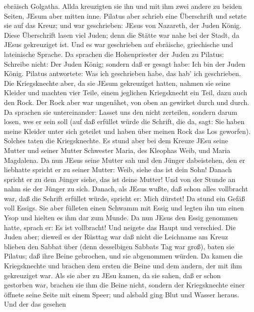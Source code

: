 ebräisch Golgatha.  Allda kreuzigten sie ihn und mit ihm
zwei andere zu beiden Seiten, JEsum aber mitten inne. 
Pilatus aber schrieb eine Überschrift und setzte sie auf das Kreuz; und
war geschrieben: JEsus von Nazareth, der Juden König. 
Diese Überschrift lasen viel Juden; denn die Stätte war nahe bei der
Stadt, da JEsus gekreuziget ist. Und es war geschrieben auf ebräische,
griechische und lateinische Sprache.  Da sprachen die
Hohenpriester der Juden zu Pilatus: Schreibe nicht: Der Juden König;
sondern daß er gesagt habe: Ich bin der Juden König. 
Pilatus antwortete: Was ich geschrieben habe, das hab' ich geschrieben.
 Die Kriegsknechte aber, da sie JEsum gekreuziget hatten,
nahmen sie seine Kleider und machten vier Teile, einem jeglichen
Kriegsknecht ein Teil, dazu auch den Rock. Der Rock aber war ungenähet,
von oben an gewirket durch und durch.  Da sprachen sie
untereinander: Lasset uns den nicht zerteilen, sondern darum losen, wes
er sein soll (auf daß erfüllet würde die Schrift, die da, sagt: Sie
haben meine Kleider unter sich geteilet und haben über meinen Rock das
Los geworfen). Solches taten die Kriegsknechte.  Es stund
aber bei dem Kreuze JEsu seine Mutter und seiner Mutter Schwester Maria,
des Kleophas Weib, und Maria Magdalena.  Da nun JEsus seine
Mutter sah und den Jünger dabeistehen, den er liebhatte spricht er zu
seiner Mutter: Weib, siehe das ist dein Sohn!  Danach
spricht er zu dem Jünger siehe, das ist deine Mutter! Und von der Stunde
an nahm sie der Jünger zu sich.  Danach, als JEsus wußte,
daß schon alles vollbracht war, daß die Schrift erfüllet würde, spricht
er: Mich dürstet!  Da stund ein Gefäß voll Essigs. Sie aber
fülleten einen Schwamm mit Essig und legten ihn um einen Ysop und
hielten es ihm dar zum Munde.  Da nun JEsus den Essig
genommen hatte, sprach er: Es ist vollbracht! Und neigete das Haupt und
verschied.  Die Juden aber; dieweil es der Rüsttag war daß
nicht die Leichname am Kreuz blieben den Sabbat über (denn desselbigen
Sabbats Tag war groß), baten sie Pilatus; daß ihre Beine gebrochen, und
sie abgenommen würden.  Da kamen die Kriegsknechte und
brachen dem ersten die Beine und dem andern, der mit ihm gekreuziget
war.  Als sie aber zu JEsu kamen, da sie sahen, daß er
schon gestorben war, brachen sie ihm die Beine nicht, 
sondern der Kriegsknechte einer öffnete seine Seite mit einem Speer; und
alsbald ging Blut und Wasser heraus.  Und der das gesehen
